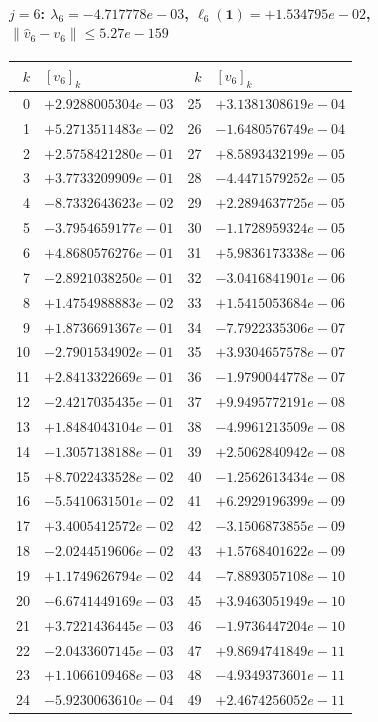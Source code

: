 \documentclass[11pt]{article}
\begin{document}
\paragraph{$j = 6$: $\lambda_{6} = -4.717778e-03$, \quad $\ell_{6}(\mathbf{1}) = +1.534795e-02$, \quad $\|\hat v_{6} - v_{6}\| \leq 5.27e-159$}
\begin{center}
{\footnotesize
\begin{tabular}{r@{\;\;}l@{\quad}r@{\;\;}l}
\toprule
$k$ & $[v_{6}]_k$ & $k$ & $[v_{6}]_k$ \\
\midrule
0 & $+2.9288005304e-03$ & 25 & $+3.1381308619e-04$ \\
1 & $+5.2713511483e-02$ & 26 & $-1.6480576749e-04$ \\
2 & $+2.5758421280e-01$ & 27 & $+8.5893432199e-05$ \\
3 & $+3.7733209909e-01$ & 28 & $-4.4471579252e-05$ \\
4 & $-8.7332643623e-02$ & 29 & $+2.2894637725e-05$ \\
5 & $-3.7954659177e-01$ & 30 & $-1.1728959324e-05$ \\
6 & $+4.8680576276e-01$ & 31 & $+5.9836173338e-06$ \\
7 & $-2.8921038250e-01$ & 32 & $-3.0416841901e-06$ \\
8 & $+1.4754988883e-02$ & 33 & $+1.5415053684e-06$ \\
9 & $+1.8736691367e-01$ & 34 & $-7.7922335306e-07$ \\
10 & $-2.7901534902e-01$ & 35 & $+3.9304657578e-07$ \\
11 & $+2.8413322669e-01$ & 36 & $-1.9790044778e-07$ \\
12 & $-2.4217035435e-01$ & 37 & $+9.9495772191e-08$ \\
13 & $+1.8484043104e-01$ & 38 & $-4.9961213509e-08$ \\
14 & $-1.3057138188e-01$ & 39 & $+2.5062840942e-08$ \\
15 & $+8.7022433528e-02$ & 40 & $-1.2562613434e-08$ \\
16 & $-5.5410631501e-02$ & 41 & $+6.2929196399e-09$ \\
17 & $+3.4005412572e-02$ & 42 & $-3.1506873855e-09$ \\
18 & $-2.0244519606e-02$ & 43 & $+1.5768401622e-09$ \\
19 & $+1.1749626794e-02$ & 44 & $-7.8893057108e-10$ \\
20 & $-6.6741449169e-03$ & 45 & $+3.9463051949e-10$ \\
21 & $+3.7221436445e-03$ & 46 & $-1.9736447204e-10$ \\
22 & $-2.0433607145e-03$ & 47 & $+9.8694741849e-11$ \\
23 & $+1.1066109468e-03$ & 48 & $-4.9349373601e-11$ \\
24 & $-5.9230063610e-04$ & 49 & $+2.4674256052e-11$ \\
\bottomrule
\end{tabular}
}
\end{center}
\end{document}
